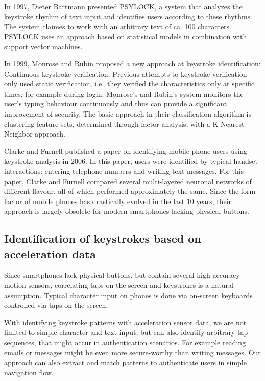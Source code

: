 In 1997, Dieter Bartmann presented PSYLOCK\cite{bartmann1997psylock}, a system that analyzes the keystroke rhythm of text input and identifies users according to these rhythms. The system claimes to work with an arbitrary text of ca. 100 characters. PSYLOCK uses an approach based on statistical models in combination with support vector machines.

In 1999, Monrose and Rubin\cite{monrose2000keystroke} proposed a new approach at keystroke identification: Continuous keystroke verification. Previous attempts to keystroke verification only used static verification, i.e.\ they verified the characteristics only at specific times, for example during login. Monrose's and Rubin's system monitors the user's typing behaviour continuously and thus can provide a significant improvement of security. The basic approach in their classification algorithm is clustering feature sets, determined through factor analysis, with a K-Nearest Neighbor approach.

Clarke and Furnell\cite{clarke2007authenticating} published a paper on identifying mobile phone users using keystroke analysis in 2006. In this paper, users were identified by typical handset interactions: entering telephone numbers and writing text messages. For this paper, Clarke and Furnell compared several multi-layered neuronal networks of different flavour, all of which performed approximately the same. Since the form factor of mobile phones has drastically evolved in the last 10 years, their approach is largely obsolete for modern smartphones lacking physical buttons.
\subsection{Identification of keystrokes based on acceleration data}\label{subsection:keystrokerecognition}
Since smartphones lack physical buttons, but contain several high accuracy motion sensors, correlating taps on the screen and keystrokes is a natural assumption. Typical character input on phones is done via on-screen keyboards controlled via taps on the screen. 

With identifying keystroke patterns with acceleration sensor data, we are not limited to simple character and text input, but can also identify arbitrary tap sequences, that might occur in authentication scenarios. For example reading emails or messages might be even more secure-worthy than writing messages. Our approach can also extract and match patterns to authenticate users in simple navigation flow.

